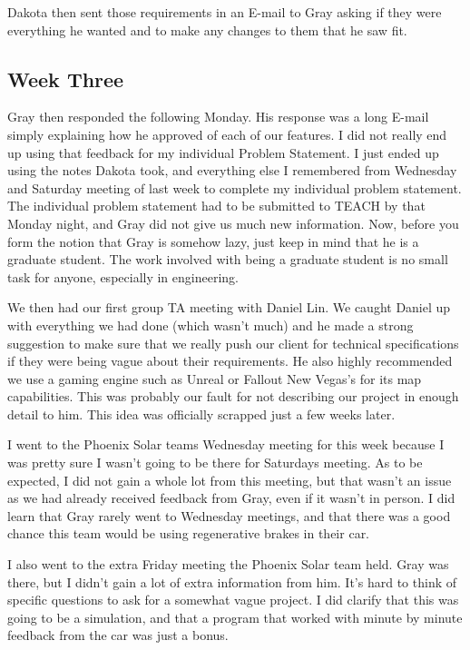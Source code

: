 \begin{singlespace}
Dakota then sent those requirements in an E-mail to Gray asking if they were everything he wanted and to make any changes to them that he saw fit.

\subsection{Week Three}
Gray then responded the following Monday.
His response was a long E-mail simply explaining how he approved of each of our features.
I did not really end up using that feedback for my individual Problem Statement.
I just ended up using the notes Dakota took, and everything else I remembered from Wednesday and Saturday meeting of last week to complete my individual problem statement.
The individual problem statement had to be submitted to TEACH by that Monday night, and Gray did not give us much new information.
Now, before you form the notion that Gray is somehow lazy, just keep in mind that he is a graduate student.
The work involved with being a graduate student is no small task for anyone, especially in engineering.

We then had our first group TA meeting with Daniel Lin.
We caught Daniel up with everything we had done (which wasn't much) and he made a strong suggestion to make sure that we really push our client for technical specifications if they were being vague about their requirements.
He also highly recommended we use a gaming engine such as Unreal or Fallout New Vegas's for its map capabilities.
This was probably our fault for not describing our project in enough detail to him.
This idea was officially scrapped just a few weeks later.

I went to the Phoenix Solar teams Wednesday meeting for this week because I was pretty sure I wasn't going to be there for Saturdays meeting.
As to be expected, I did not gain a whole lot from this meeting, but that wasn't an issue as we had already received feedback from Gray, even if it wasn't in person.
I did learn that Gray rarely went to Wednesday meetings, and that there was a good chance this team would be using regenerative brakes in their car.

I also went to the extra Friday meeting the Phoenix Solar team held.
Gray was there, but I didn't gain a lot of extra information from him.
It's hard to think of specific questions to ask for a somewhat vague project.
I did clarify that this was going to be a simulation, and that a program that worked with minute by minute feedback from the car was just a bonus.


\end{singlespace}
